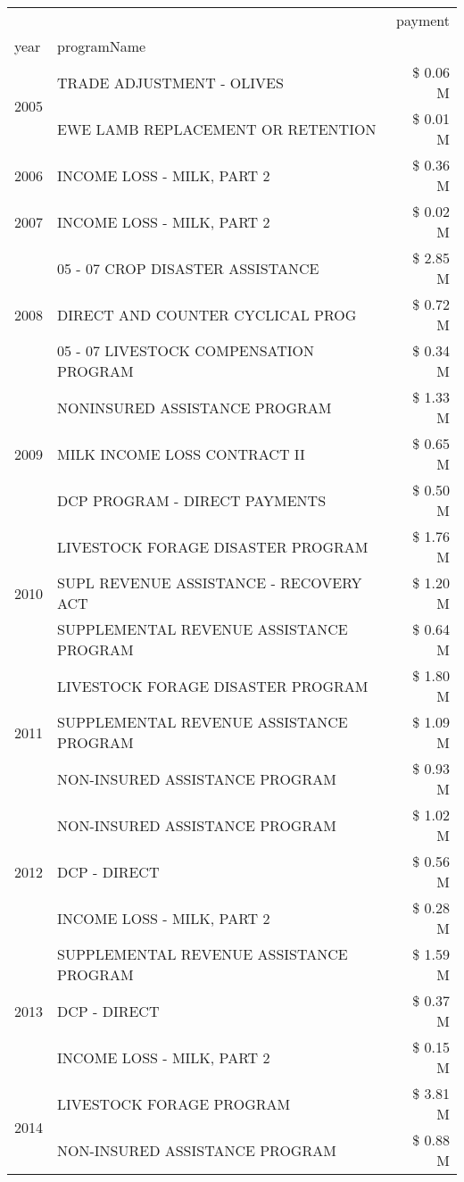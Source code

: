 \begin{tabular}{llr}
\toprule
 &  & payment \\
year & programName &  \\
\midrule
\multirow[t]{2}{*}{2005} & TRADE ADJUSTMENT - OLIVES & \$ 0.06 M \\
 & EWE LAMB REPLACEMENT OR RETENTION & \$ 0.01 M \\
\cline{1-3}
2006 & INCOME LOSS - MILK, PART 2 & \$ 0.36 M \\
\cline{1-3}
2007 & INCOME LOSS - MILK, PART 2 & \$ 0.02 M \\
\cline{1-3}
\multirow[t]{3}{*}{2008} & 05 - 07 CROP DISASTER ASSISTANCE & \$ 2.85 M \\
 & DIRECT AND COUNTER CYCLICAL PROG & \$ 0.72 M \\
 & 05 - 07 LIVESTOCK COMPENSATION PROGRAM & \$ 0.34 M \\
\cline{1-3}
\multirow[t]{3}{*}{2009} & NONINSURED ASSISTANCE PROGRAM & \$ 1.33 M \\
 & MILK INCOME LOSS CONTRACT II & \$ 0.65 M \\
 & DCP PROGRAM - DIRECT PAYMENTS & \$ 0.50 M \\
\cline{1-3}
\multirow[t]{3}{*}{2010} & LIVESTOCK FORAGE DISASTER PROGRAM & \$ 1.76 M \\
 & SUPL REVENUE ASSISTANCE - RECOVERY ACT & \$ 1.20 M \\
 & SUPPLEMENTAL REVENUE ASSISTANCE PROGRAM & \$ 0.64 M \\
\cline{1-3}
\multirow[t]{3}{*}{2011} & LIVESTOCK FORAGE DISASTER PROGRAM & \$ 1.80 M \\
 & SUPPLEMENTAL REVENUE ASSISTANCE PROGRAM & \$ 1.09 M \\
 & NON-INSURED ASSISTANCE PROGRAM & \$ 0.93 M \\
\cline{1-3}
\multirow[t]{3}{*}{2012} & NON-INSURED ASSISTANCE PROGRAM & \$ 1.02 M \\
 & DCP - DIRECT & \$ 0.56 M \\
 & INCOME LOSS - MILK, PART 2 & \$ 0.28 M \\
\cline{1-3}
\multirow[t]{3}{*}{2013} & SUPPLEMENTAL REVENUE ASSISTANCE PROGRAM & \$ 1.59 M \\
 & DCP - DIRECT & \$ 0.37 M \\
 & INCOME LOSS - MILK, PART 2 & \$ 0.15 M \\
\cline{1-3}
\multirow[t]{3}{*}{2014} & LIVESTOCK FORAGE PROGRAM & \$ 3.81 M \\
 & NON-INSURED ASSISTANCE PROGRAM & \$ 0.88 M \\

\end{tabular}
